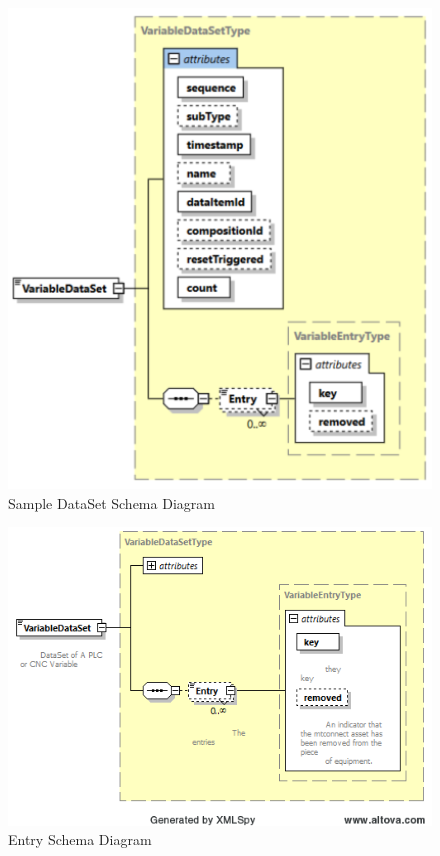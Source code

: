 \begin{figure}[ht]
  \centering
    \includegraphics[width=1.0\textwidth]{figures/Sample DataSet Schema.png}
  \caption{Sample DataSet Schema Diagram}
  \label{fig:Sample DataSet Schema Diagram}
\end{figure}

\FloatBarrier


\begin{figure}[ht]
  \centering
    \includegraphics[width=1.0\textwidth]{figures/Entry Schema.png}
  \caption{Entry Schema Diagram}
  \label{fig:Entry Schema Diagram}
\end{figure}

